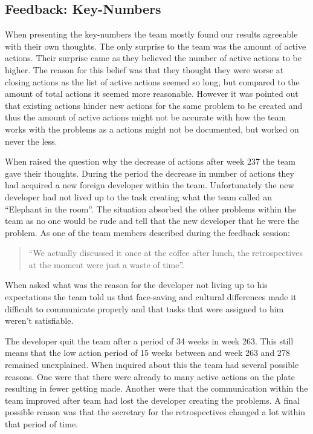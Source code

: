 \subsection{Feedback: Key-Numbers}
When presenting the key-numbers the team mostly found our results agreeable with their own thoughts. The only surprise to the team was the amount of active actions. Their surprise came as they believed the number of active actions to be higher. The reason for this belief was that they thought they were worse at closing actions as the list of active actions seemed so long, but compared to the amount of total actions it seemed more reasonable. However it was pointed out that existing actions hinder new actions for the same problem to be created and thus the amount of active actions might not be accurate with how the team works with the problems as a actions might not be documented, but worked on never the less. 

When raised the question why the decrease of actions after week 237 the team gave their thoughts. During the period the decrease in number of actions they had acquired a new foreign developer within the team. Unfortunately the new developer had not lived up to the task creating what the team called an ``Elephant in the room''. The situation absorbed the other problems within the team as no one would be rude and tell that the new developer that he were the problem. As one of the team members described during the feedback session: 
\begin{quote}
``We actually discussed it once at the coffee after lunch, the retrospectives at the moment were just a waste of time''. 
\end{quote}
When asked what was the reason for the developer not living up to his expectations the team told us that face-saving and cultural differences made it difficult to communicate properly and that tasks that were assigned to him weren't satisfiable. 

The developer quit the team after a period of 34 weeks in week 263. This still means that the low action period of 15 weeks between and week 263 and 278 remained unexplained. When inquired about this the team had several possible reasons. One were that there were already to many active actions on the plate resulting in fewer getting made. Another were that the communication within the team improved after team had lost the developer creating the problems. A final possible reason was that the secretary for the retrospectives changed a lot within that period of time. 

